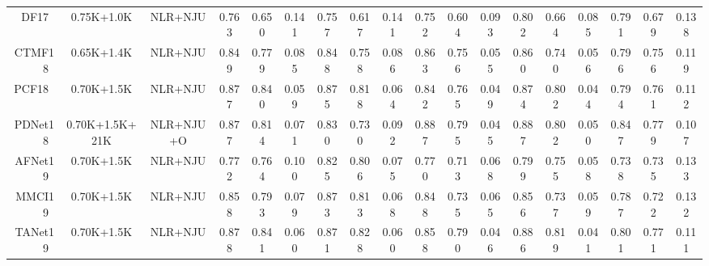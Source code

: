 \documentclass[journal]{IEEEtran}
\begin{document}
\begin{table*}[t]
{\begin{tabular}{r|cc|ccc|ccc|ccc|ccc|ccc}
    DF17~\cite{TIP_Q2017}  & \multicolumn{1}{c}{0.75K+1.0K} & NLR+NJU & \multicolumn{1}{c}{0.763} & \multicolumn{1}{c}{0.650} & 0.141 & \multicolumn{1}{c}{0.757} & \multicolumn{1}{c}{0.617} & 0.141 & \multicolumn{1}{c}{0.752} & \multicolumn{1}{c}{0.604} & 0.093 & \multicolumn{1}{c}{0.802} & \multicolumn{1}{c}{0.664} & 0.085 & \multicolumn{1}{c}{0.791} & 0.679 & 0.138 \\
    CTMF18~\cite{han2017cnns} & \multicolumn{1}{c}{0.65K+1.4K} & NLR+NJU & \multicolumn{1}{c}{0.849} & \multicolumn{1}{c}{0.779} & 0.085 & \multicolumn{1}{c}{0.848} & \multicolumn{1}{c}{0.758} & 0.086 & \multicolumn{1}{c}{0.863} & \multicolumn{1}{c}{0.756} & 0.055 & \multicolumn{1}{c}{0.860} & \multicolumn{1}{c}{0.740} & 0.056 & \multicolumn{1}{c}{0.796} & 0.756 & 0.119 \\
    PCF18~\cite{chen2018progressively} & \multicolumn{1}{c}{0.70K+1.5K} & NLR+NJU & \multicolumn{1}{c}{0.877} & \multicolumn{1}{c}{0.840} & 0.059 & \multicolumn{1}{c}{0.875} & \multicolumn{1}{c}{0.818} & 0.064 & \multicolumn{1}{c}{0.842} & \multicolumn{1}{c}{0.765} & 0.049 & \multicolumn{1}{c}{0.874} & \multicolumn{1}{c}{0.802} & 0.044 & \multicolumn{1}{c}{0.794} & 0.761 & 0.112 \\
    PDNet18~\cite{Zhu2018PDNet} & \multicolumn{1}{c}{0.70K+1.5K+21K} & NLR+NJU+O & \multicolumn{1}{c}{0.877} & \multicolumn{1}{c}{0.814} & 0.071 & \multicolumn{1}{c}{0.830} & \multicolumn{1}{c}{0.730} & 0.092 & \multicolumn{1}{c}{0.887} & \multicolumn{1}{c}{0.795} & 0.045 & \multicolumn{1}{c}{0.887} & \multicolumn{1}{c}{0.802} & 0.050 & \multicolumn{1}{c}{0.847} & 0.779 & 0.107 \\
    AFNet19~\cite{wang2019adaptive} & \multicolumn{1}{c}{0.70K+1.5K} & NLR+NJU & \multicolumn{1}{c}{0.772} & \multicolumn{1}{c}{0.764} & 0.100 & \multicolumn{1}{c}{0.825} & \multicolumn{1}{c}{0.806} & 0.075 & \multicolumn{1}{c}{0.770} & \multicolumn{1}{c}{0.713} & 0.068 & \multicolumn{1}{c}{0.799} & \multicolumn{1}{c}{0.755} & 0.058 & \multicolumn{1}{c}{0.738} & 0.735 & 0.133 \\
    MMCI19~\cite{chen2019multi} & \multicolumn{1}{c}{0.70K+1.5K} & NLR+NJU & \multicolumn{1}{c}{0.858} & \multicolumn{1}{c}{0.793} & 0.079 & \multicolumn{1}{c}{0.873} & \multicolumn{1}{c}{0.813} & 0.068 & \multicolumn{1}{c}{0.848} & \multicolumn{1}{c}{0.735} & 0.065 & \multicolumn{1}{c}{0.856} & \multicolumn{1}{c}{0.737} & 0.059 & \multicolumn{1}{c}{0.787} & 0.722 & 0.132 \\
    TANet19~\cite{chen2019three} & \multicolumn{1}{c}{0.70K+1.5K} & NLR+NJU & \multicolumn{1}{c}{0.878} & \multicolumn{1}{c}{0.841} & 0.060 & \multicolumn{1}{c}{0.871} & \multicolumn{1}{c}{0.828} & 0.060 & \multicolumn{1}{c}{0.858} & \multicolumn{1}{c}{0.790} & 0.046 & \multicolumn{1}{c}{0.886} & \multicolumn{1}{c}{0.819} & 0.041 & \multicolumn{1}{c}{0.801} & 0.771 & 0.111 \\

\end{tabular}}
\end{table*}
\end{document}

